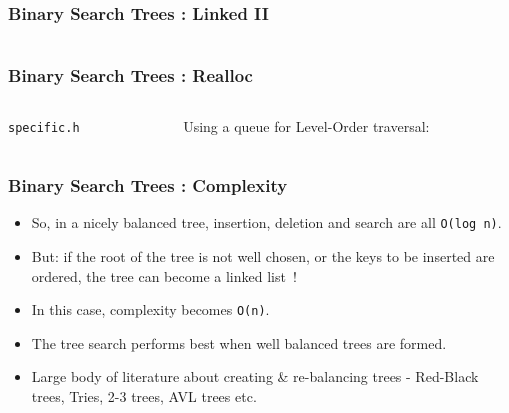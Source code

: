 
\begin{frame}[fragile]
\frametitle{Binary Search Trees : Linked II}
\begin{columns}[T]

\begin{column}{0.45\textwidth}

\end{column}

\pause
\begin{column}{0.45\textwidth}

\end{column}

\end{columns}
\end{frame}


\begin{frame}[fragile]
\frametitle{Binary Search Trees : Realloc}
\begin{columns}[T]

\begin{column}{0.45\textwidth}
\verb^specific.h^

\end{column}

\pause
\begin{column}{0.45\textwidth}
Using a queue for Level-Order traversal:

\end{column}

\end{columns}
\end{frame}


\begin{frame}[fragile]
\frametitle{Binary Search Trees : Complexity}

\begin{itemize}[<+->]
\item So, in a nicely balanced tree, insertion, deletion and search are all \verb^O(log n)^.
\item  But: if the root of the tree is not well chosen, or the keys to be inserted are ordered, the tree can become a linked list~!
\item In this case,  complexity becomes \verb^O(n)^.	
\item The tree search performs best when well balanced trees are formed.
\item Large body of literature about creating \& re-balancing trees - Red-Black trees, Tries, 2-3 trees, AVL trees etc.
\end{itemize}

\end{frame}

